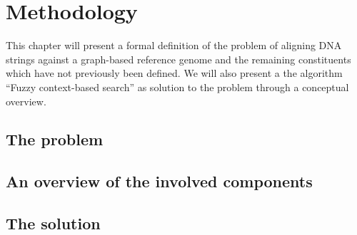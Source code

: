 \documentclass[thesis.tex]{subfiles}
\begin{document}
\chapter{Methodology}
This chapter will present a formal definition of the problem of aligning DNA strings against a graph-based reference genome and the remaining constituents which have not previously been defined. We will also present a the algorithm ``Fuzzy context-based search'' as solution to the problem through a conceptual overview.
\section{The problem}
\section{An overview of the involved components}
\section{The solution}
\end{document}

